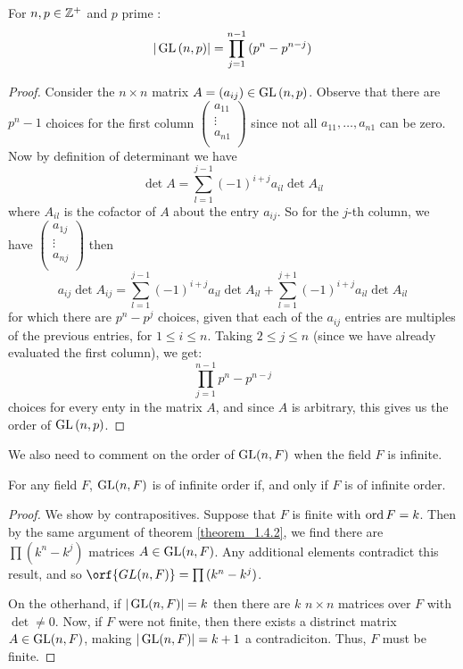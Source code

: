 \begin{theorem}\label{theorem_1.4.2}
  For $n, p \in \mathbb{Z}^+$ and  $p$ prime :
  \begin{equation}
    |\operatorname{GL}{(n,p)}|=\prod_{j=1}^{n-1}{(p^n-p^{n-j})}
  \end{equation}
\end{theorem}
\begin{proof}
  Consider the $n \times n$ matrix $A=(a_{ij}) \in \operatorname{GL}{(n,p)}$.
  Observe that there are $p^n-1$ choices for the first column $
  \begin{pmatrix}
    a_{11}  \\ \vdots  \\ a_{n1} \\
  \end{pmatrix}
  $ since not all $a_{11}, \dots, a_{n1}$ can be zero. Now by
  definition of determinant we have
  \begin{equation*}
    \det{A}=\sum_{l=1}^{j-1}{(-1)^{i+j}a_{il}\det{A_{il}}}
  \end{equation*}
  where $A_{il}$ is the cofactor of $A$ about the entry  $a_{ij}$. So
  for the $j$-th column, we have $
  \begin{pmatrix}
    a_{1j}  \\  \vdots  \\  a_{nj}  \\
  \end{pmatrix}
  $
  then
  \begin{equation*}
    a_{ij}\det{A_{ij}}=\sum_{l=1}^{j-1}{(-1)^{i+j}a_{il}\det{A_{il}}}+
  \sum_{l=1}^{j+1}{(-1)^{i+j}a_{il}\det{A_{il}}}
  \end{equation*}
  for which there are $p^n-p^j$ choices, given that each of the
  $a_{ij}$ entries are multiples of the previous entries, for $1 \leq
  i \leq n$. Taking $2 \leq j \leq n$ (since we have already evaluated
  the first column), we get:
  \begin{equation*}
    \prod_{j=1}^{n-1}{p^n-p^{n-j}}
  \end{equation*}
  choices for every enty in the matrix $A$, and since $A$ is
  arbitrary, this gives us the order of $\operatorname{GL}{(n,p)}$.
\end{proof}

We also need to comment on the order of $\operatorname{GL}(n,F)$ when the field $F$ is
infinite.

\begin{theorem}\label{theorem_1.4.3}
  For any field $F$,  $\operatorname{GL}(n,F)$ is of infinite order if, and only if $F$ is
  of infinite order.
\end{theorem}
\begin{proof}
  We show by contrapositives. Suppose that $F$ is finite with  $\operatorname{ord}{F}=k$.
  Then by the same argument of theorem \ref{theorem_1.4.2}, we find there are
  $\prod{(k^n-k^j)}$ matrices $A \in \operatorname{GL}(n,F)$. Any additional elements
  contradict this result, and so $\orf{GL(n,F)}=\prod{(k^n-k^j)}$.

  On the otherhand, if $|\operatorname{GL}(n,F)|=k$ then there are $k$ $n \times n$
  matrices over  $F$ with $\det \neq 0$. Now, if  $F$ were not finite, then
  there exists a distrinct matrix  $A \in \operatorname{GL}(n,F)$, making $|\operatorname{GL}(n,F)|=k+1$
  a contradiciton. Thus, $F$ must be finite.
\end{proof}

